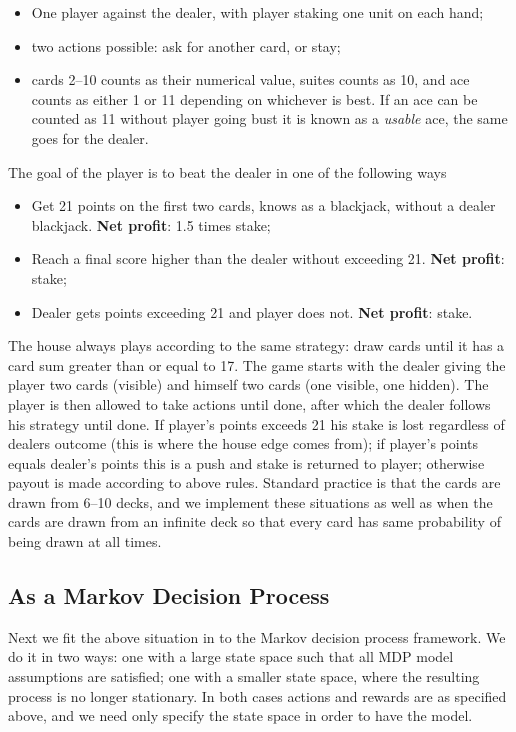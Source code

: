 \begin{itemize}
	\item One player against the dealer, with player staking one unit on each hand;
	\item two actions possible: ask for another card, or stay;
	\item cards 2--10 counts as their numerical value, suites counts as 10, and ace counts as either 1 or 11 depending on whichever is best. If an ace can be counted as 11 without player going bust it is known as a \textit{usable} ace, the same goes for the dealer.
\end{itemize}
The goal of the player is to beat the dealer in one of the following ways
\begin{itemize}
	\item Get 21 points on the first two cards, knows as a blackjack, without a dealer blackjack. \textbf{Net profit}: 1.5 times stake;
	\item Reach a final score higher than the dealer without exceeding 21. \textbf{Net profit}: stake;
	\item Dealer gets points exceeding 21 and player does not. \textbf{Net profit}: stake.
\end{itemize}
The house always plays according to the same strategy: draw cards until it has a card sum greater than or equal to 17. The game starts with the dealer giving the player two cards (visible) and himself two cards (one visible, one hidden). The player is then allowed to take actions until done, after which the dealer follows his strategy until done. If player's points exceeds 21 his stake is lost regardless of dealers outcome (this is where the house edge comes from); if player's points equals dealer's points this is a push and stake is returned to player; otherwise payout is made according to above rules. Standard practice is that the cards are drawn from 6--10 decks, and we implement these situations as well as when the cards are drawn from an infinite deck so that every card has same probability of being drawn at all times.

\subsection*{As a Markov Decision Process}
Next we fit the above situation in to the Markov decision process framework. We do it in two ways: one with a large state space such that all MDP model assumptions are satisfied; 
one with a smaller state space,
where the resulting process is  no longer stationary. In both cases actions and rewards are as specified above, and we need only specify the state space in order to have the model.


